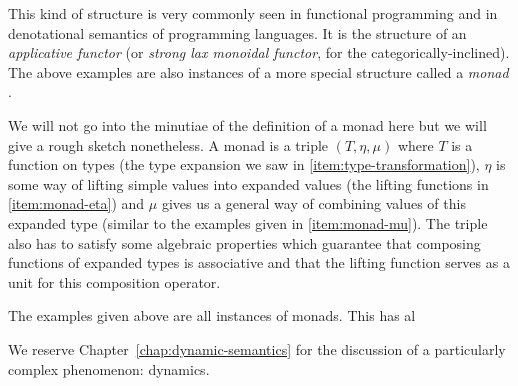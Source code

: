 This kind of structure is very commonly seen in functional programming and
in denotational semantics of programming languages. It is the structure of
an \emph{applicative functor} \cite{mcbride2008applicative} (or
\emph{strong lax monoidal functor}, for the categorically-inclined). The
above examples are also instances of a more special structure called a
\emph{monad} \cite{moggi1991notions}.

We will not go into the minutiae of the definition of a monad here but we
will give a rough sketch nonetheless. A monad is a triple $(T, \eta, \mu)$
where $T$ is a function on types (the type expansion we saw in
\ref{item:type-transformation}), $\eta$ is some way of lifting simple
values into expanded values (the lifting functions in \ref{item:monad-eta})
and $\mu$ gives us a general way of combining values of this expanded type
(similar to the examples given in \ref{item:monad-mu}). The triple also has
to satisfy some algebraic properties which guarantee that composing
functions of expanded types is associative and that the lifting function
serves as a unit for this composition operator.

The examples given above are all instances of monads. This has al





We reserve Chapter~\ref{chap:dynamic-semantics} for the discussion of a
particularly complex phenomenon: dynamics. 
